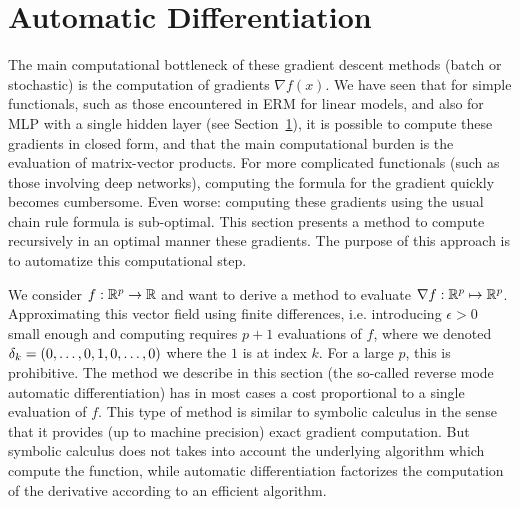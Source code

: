 


\section{Automatic Differentiation}

The main computational bottleneck of these gradient descent methods (batch or stochastic) is the computation of gradients $\nabla f(x)$. We have seen that for simple functionals, such as those encountered in ERM for linear models, and also for MLP with a single hidden layer (see Section~\ref{}), it is possible to compute these gradients in closed form, and that the main computational burden is the evaluation of matrix-vector products. For more complicated functionals (such as those involving deep networks), computing the formula for the gradient quickly becomes cumbersome. Even worse: computing these gradients using the usual chain rule formula is sub-optimal. This section presents a method to compute recursively in an optimal manner these gradients. The purpose of this approach is to automatize this computational step.  

We consider $f : \mathbb{R}^p \rightarrow \mathbb{R}$ and want to derive a method to evaluate $\nabla f : \mathbb{R}^p \mapsto \mathbb{R}^p$. Approximating this vector field using finite differences, i.e. introducing $\epsilon>0$ small enough and computing 
requires $p+1$ evaluations of $f$, where we denoted $\delta_k=(0,\ldots,0,1,0,\ldots,0)$ where the $1$ is at index $k$. 
%
For a large $p$, this is prohibitive. The method we  describe in this section (the so-called reverse mode automatic differentiation) has in most cases a cost proportional to a single evaluation of $f$. 
%
This type of method is similar to symbolic calculus in the sense that it provides (up to machine precision) exact gradient computation. But symbolic calculus does not takes into account the underlying algorithm which compute the function, while automatic differentiation factorizes the computation of the derivative according to an efficient algorithm.


